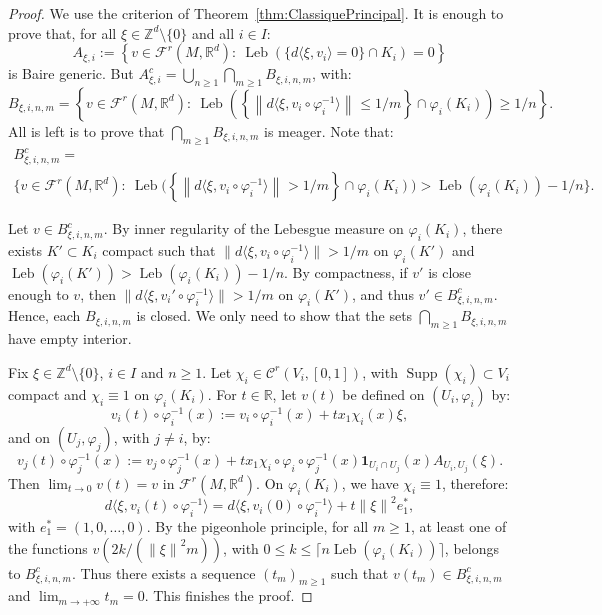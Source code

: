 \documentclass[AHL,Unicode,longabstracts]{cedram}
\DeclareMathOperator{\Leb}{Leb}
\DeclareMathOperator{\Supp}{Supp}
\newcommand{\Z}{\mathbb{Z}}
\newcommand{\R}{\mathbb{R}}
\newcommand{\Ccal}{\mathcal{C}}
\newcommand{\Fcal}{\mathcal{F}}
\newcommand{\norm}[2]{\left\| #1 \right\|_{#2}}
\begin{document}
\begin{proof}
We use the criterion of Theorem~\ref{thm:ClassiquePrincipal}. It is enough to prove that, for all $\xi \in \Z^d \setminus \{0\}$ and all $i \in I$:
\[
A_{\xi, i} := \left\{v \in \Fcal^r (M, \R^d): \ \Leb (\{d \langle \xi, v_i \rangle =0\} \cap K_i) = 0\right\}
\]
is Baire generic. But $A_{\xi, i}^c = \bigcup_{n \geq 1} \bigcap_{m \geq 1} B_{\xi, i, n, m}$, with:
\[
B_{\xi, i, n, m} = \left\{v \in \Fcal^r (M, \R^d): \ \Leb \left(\left\{\norm{d\langle \xi, v_i \circ \varphi_i^{-1} \rangle}{} \leq 1/m\right\} \cap \varphi_i(K_i)\right) \geq 1/n\right\}.
\]
All is left is to prove that $\bigcap_{m \geq 1} B_{\xi, i, n, m}$ is meager. Note that:
\begin{multline*}
B_{\xi, i, n, m}^c  =\\
\Big\{v \in \Fcal^r (M, \R^d):\!\ \Leb \Big(\left\{ \norm{d\langle \xi, v_i \circ \varphi_i^{-1} \rangle}{} > 1/m \right\} \cap \varphi_i(K_i) \Big) 
> \Leb (\varphi_i(K_i))-1/n \Big\}.
\end{multline*}



Let $v \in B_{\xi, i, n, m}^c$. By inner regularity of the Lebesgue measure on $\varphi_i (K_i)$, there exists $K' \subset K_i$ compact such that $\|{d\langle \xi, v_i \circ \varphi_i^{-1} \rangle}\|{} > 1/m$ on $\varphi_i(K')$ and $\Leb(\varphi_i(K'))> \Leb (\varphi_i(K_i))-1/n$. By compactness, if $v'$ is close enough to $v$, then $\|{d\langle \xi, v_i' \circ \varphi_i^{-1} \rangle}\|{} > 1/m$ on $\varphi_i(K')$, and thus $v' \in B_{\xi, i, n, m}^c$. Hence, each $B_{\xi, i, n, m}$ is closed. We only need to show that the sets $\bigcap_{m \geq 1} B_{\xi, i, n, m}$ have empty interior.


Fix $\xi \in \Z^d \setminus \{0\}$, $i \in I$ and $n \geq 1$. Let $\chi_i \in \Ccal^r (V_i,[0,1])$, with $\Supp (\chi_i) \subset V_i$ compact and $\chi_i \equiv 1$ on $\varphi_i(K_i)$. For $t \in \R$, let $v (t)$ be defined on $(U_i, \varphi_i)$ by:
\[
v_i (t) \circ \varphi_i^{-1} (x) := v_i \circ \varphi_i^{-1} (x)+ t x_1 \chi_i (x) \xi,
\]
and on $(U_j, \varphi_j)$, with $j \neq i$, by:
\[
v_j (t) \circ \varphi_j^{-1} (x) := v_j \circ \varphi_j^{-1} (x) + t x_1 \chi_i \circ \varphi_i \circ \varphi_j^{-1} (x) \mathbf{1}_{U_i \cap U_j} (x) A_{U_i, U_j} (\xi).
\]
Then $\lim_{t \to 0} v(t) = v$ in $\Fcal^r (M, \R^d)$. On $\varphi_i(K_i)$, we have $\chi_i \equiv 1$, therefore:
\[
d\langle \xi, v_i (t) \circ \varphi_i^{-1} \rangle = d\langle \xi, v_i (0) \circ \varphi_i^{-1} \rangle + t \norm{\xi}{}^2 e_1^*,
\]
with $e_1^* = (1,0, \ldots, 0)$. By the pigeonhole principle, for all $m \geq 1$, at least one of the functions $v(2k/(\norm{\xi}{}^2 m))$, with $0 \leq k \leq \lceil n \Leb (\varphi_i(K_i)) \rceil$, belongs to $B_{\xi, i, n, m}^c$. Thus there exists a sequence $(t_m)_{m \geq 1}$ such that $v(t_m) \in B_{\xi, i, n, m}^c$ and $\lim_{m \to + \infty} t_m = 0$. This finishes the proof.
\end{proof}
\end{document}
